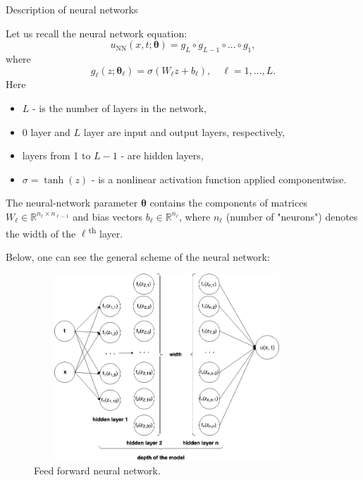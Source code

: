 \documentclass{beamer}
\def\\{}%
\renewcommand{\vec}[1]{\boldsymbol{#1}}
\newcommand{\VTheta}{\ensuremath{\vec{\theta}}}
\newcommand{\R}{\mathbb R}
\newcommand{\UNN}[1][\text{NN}]{u_{#1}}
\begin{document}
\begin{frame}{Description of neural networks}
    
Let us recall the neural network equation:
$$
\UNN(x, t; \vec{\theta}) = g_L \circ g_{L-1} \circ \dots \circ g_1,
$$
where
\[
    g_\ell(z; \VTheta_\ell) = \sigma (W_\ell z + b_\ell), \quad \ell = 1,\dots,L.
\]
Here 
\begin{itemize}
    \item $L$  - is the number of layers in the network,
    \item 0 layer and $L$ layer are input and output layers, respectively,
    \item layers from 1 to $L-1$ - are hidden layers,
    \item $\sigma = \tanh (z) $ - is a nonlinear activation function applied componentwise.
\end{itemize} 
 
The neural-network parameter $\VTheta$ contains the components of matrices
$W_\ell \in \R^{n_{\ell}\times n_{\ell-1}}$ and bias vectors
$b_\ell \in \R^{n_\ell}$, where $n_\ell$  (number of "neurons") denotes the width of the
$\ell$\textsuperscript{th} layer.
    
\end{frame}

\begin{frame}

Below, one can see the general scheme of the neural network:
\begin{figure}
\centering
\includegraphics[width = 10cm , height = 7cm]{images/FFNN.png}
\\
\caption{Feed forward neural network.}
\end{figure}
\end{frame}
\end{document}
